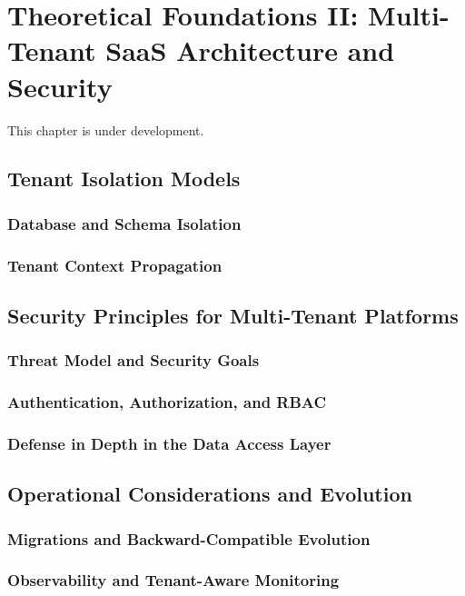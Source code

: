 \chapter{Theoretical Foundations II: Multi-Tenant SaaS Architecture and Security}
\label{chap:theoretical_foundations_multi_tenant}

This chapter is under development.

\section{Tenant Isolation Models}
\subsection{Database and Schema Isolation}
\subsection{Tenant Context Propagation}

\section{Security Principles for Multi-Tenant Platforms}
\subsection{Threat Model and Security Goals}
\subsection{Authentication, Authorization, and RBAC}
\subsection{Defense in Depth in the Data Access Layer}
\section{Operational Considerations and Evolution}
\subsection{Migrations and Backward-Compatible Evolution}
\subsection{Observability and Tenant-Aware Monitoring}
